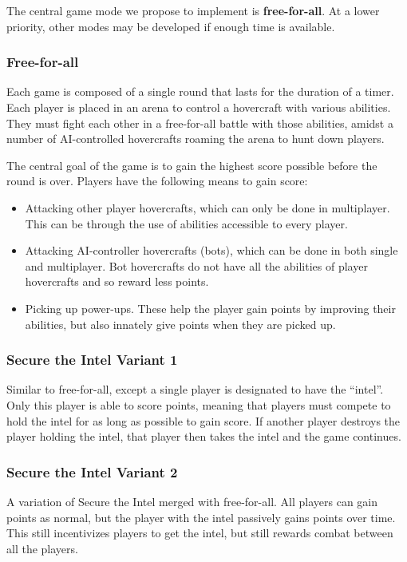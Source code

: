 \documentclass{article}
\theoremstyle{definition}
\begin{document}
The central game mode we propose to implement is \textbf{free-for-all}. At a lower
priority, other modes may be developed if enough time is available.

\subsubsection{Free-for-all}

Each game is composed of a single round that lasts for the duration of a timer.
Each player is placed in an arena to control a hovercraft with various
abilities. They must fight each other in a free-for-all battle with those
abilities, amidst a number of AI-controlled hovercrafts roaming the arena to
hunt down players.

The central goal of the game is to gain the highest score possible before the
round is over. Players have the following means to gain score:
\begin{itemize}
  \item Attacking other player hovercrafts, which can only be done in
    multiplayer. This can be through the use of abilities accessible to every
    player.
  \item Attacking AI-controller hovercrafts (bots), which can be done in both
    single and multiplayer. Bot hovercrafts do not have all the abilities of
    player hovercrafts and so reward less points.
  \item Picking up power-ups. These help the player gain points by improving
    their abilities, but also innately give points when they are picked up.
\end{itemize}

\subsubsection{Secure the Intel Variant 1}

Similar to free-for-all, except a single player is designated to have the
``intel''. Only this player is able to score points, meaning that players must
compete to hold the intel for as long as possible to gain score. If another
player destroys the player holding the intel, that player then takes the intel
and the game continues.

\subsubsection{Secure the Intel Variant 2}

A variation of Secure the Intel merged with free-for-all. All players can gain
points as normal, but the player with the intel passively gains points over
time. This still incentivizes players to get the intel, but still rewards
combat between all the players.
\end{document}
